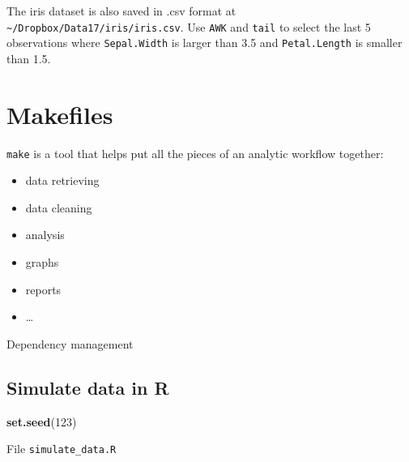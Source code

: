 \documentclass[]{book}
\newenvironment{Shaded}{\begin{snugshade}}{\end{snugshade}}
\newcommand{\KeywordTok}[1]{\textcolor[rgb]{0.13,0.29,0.53}{\textbf{#1}}}
\newcommand{\DecValTok}[1]{\textcolor[rgb]{0.00,0.00,0.81}{#1}}
\newcommand{\NormalTok}[1]{#1}
\providecommand{\tightlist}{%
  \setlength{\itemsep}{0pt}\setlength{\parskip}{0pt}}
\theoremstyle{definition}
\theoremstyle{definition}
\theoremstyle{definition}
\theoremstyle{remark}
\let\BeginKnitrBlock\begin \let\EndKnitrBlock\end
\begin{document}
\BeginKnitrBlock{exercise}
\protect\hypertarget{exr:unnamed-chunk-11}{}{\label{exr:unnamed-chunk-11}
}The iris dataset is also saved in .csv format at
\texttt{\textasciitilde{}/Dropbox/Data17/iris/iris.csv}. Use
\texttt{AWK} and \texttt{tail} to select the last 5 observations where
\texttt{Sepal.Width} is larger than 3.5 and \texttt{Petal.Length} is
smaller than 1.5.
\EndKnitrBlock{exercise}

\section{Makefiles}\label{makefiles}

\texttt{make} is a tool that helps put all the pieces of an analytic
workflow together:

\begin{itemize}
\tightlist
\item
  data retrieving
\item
  data cleaning
\item
  analysis
\item
  graphs
\item
  reports
\item
  \ldots{}
\end{itemize}

Dependency management

\subsection{Simulate data in R}\label{simulate-data-in-r}

\begin{Shaded}
\begin{Highlighting}[]
\KeywordTok{set.seed}\NormalTok{(}\DecValTok{123}\NormalTok{)}
\end{Highlighting}
\end{Shaded}

File \texttt{simulate\_data.R}
\end{document}

